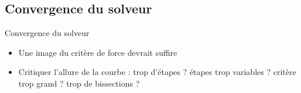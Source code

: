 \subsection{Convergence du solveur}
\label{sec:Convergence du solveur}

\begin{frame}[c]{Convergence du solveur}
    \begin{itemize}
        \item Une image du critère de force devrait suffire
        \item Critiquer l'allure de la courbe : trop d'étapes ? étapes trop variables ? critère trop grand ? trop de bissections ?
    \end{itemize}
\end{frame}